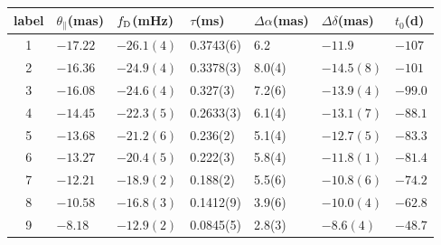 \documentclass[useAMS,usenatbib]{mn2e}
\begin{document}
\begin{table}
\centering
\begin{tabular}{c|llllll}
\hline
label & $\theta_{\parallel}$(mas) & $f_{\rm D}$(mHz) & $\tau$(ms)  & $\Delta\alpha$(mas) & $\Delta\delta$(mas) & $t_0$(d)\\
\hline
1& $-17.22$   & $-26.1(4)$    & 0.3743(6)         & 6.2    & $-11.9$      & $-107$                               \\
2& $-16.36$  & $-24.9(4)$      & 0.3378(3)         & 8.0(4)  & $-14.5(8)$      &$-101$                                \\
3& $-16.08$   & $-24.6(4)$       & 0.327(3)   & 7.2(6)  & $-13.9(4)$       & $-99.0$                                \\
4& $-14.45$   & $-22.3(5)$      & 0.2633(3)    & 6.1(4)  & $-13.1(7)$     & $-88.1$                                \\
5& $-13.68$ & $-21.2(6)$        & 0.236(2)    & 5.1(4)  & $-12.7(5)$      & $-83.3$                                \\
6& $-13.27$ & $-20.4(5)$      & 0.222(3)     & 5.8(4)  & $-11.8(1)$    & $-81.4$                                \\
7& $-12.21$   & $-18.9(2)$      & 0.188(2)   & 5.5(6) & $-10.8(6)$      & $-74.2$                        \\
8& $-10.58$   & $-16.8(3)$      & 0.1412(9)  & 3.9(6) & $-10.0(4)$      & $-62.8$                                \\
9& $-8.18$   & $-12.9(2)$      & 0.0845(5) & 2.8(3)  & $-8.6(4)$      & $-48.7$                                
\\ \hline


\end{tabular}
\end{table}
\end{document}
